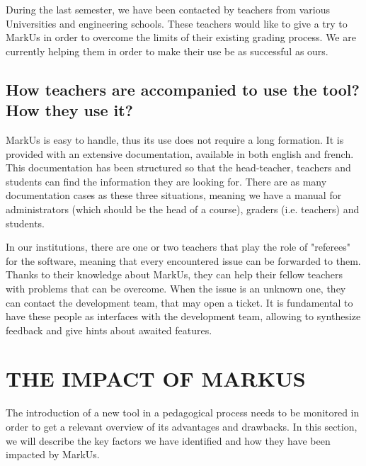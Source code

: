 \documentclass[twocolumn,10pt]{asme2e}
\begin{document}
During the last semester, we have been contacted by teachers from various Universities and engineering schools. These teachers would like to give a try to MarkUs in order to overcome the limits of their existing grading process. We are currently helping them in order to make their use be as successful as ours. 

\subsection*{How teachers are accompanied to use the tool? How they use it?}

MarkUs is easy to handle, thus its use does not require a long formation. It
is provided with an extensive documentation, available in both english and
french. This documentation has been structured so that the head-teacher,
teachers and students can find the information they are looking for. There are
as many documentation cases as these three situations, meaning we have a
manual for administrators (which should be the head of a course), graders
(i.e. teachers) and students. 

In our institutions, there are one or two teachers that play the role of "referees" for the software, meaning that every encountered issue can be forwarded to them. Thanks to their knowledge about MarkUs, they can help their fellow teachers with problems that can be overcome. When the issue is an unknown one, they can contact the development team, that may open a ticket. It is fundamental to have these people as interfaces with the development team, allowing to synthesize feedback and give hints about awaited features. 

\section*{THE IMPACT OF MARKUS}

The introduction of a new tool in a pedagogical process needs to be monitored in order to get a relevant overview of its advantages and drawbacks. In this section, we will describe the key factors we have identified and how they have been impacted by MarkUs. 

\end{document}
